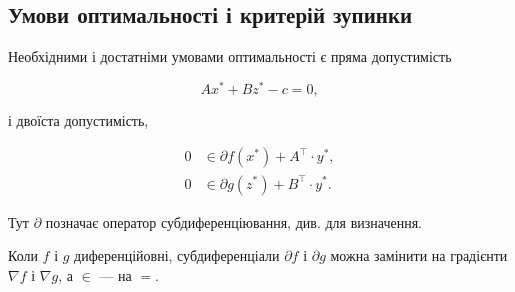 \subsection{Умови оптимальності і критерій зупинки}

\begin{lemma}
    Необхідними і достатніми умовами оптимальності є пряма допустимість
    
    \begin{equation}
    	\label{eq:3.8}
    	A x^* + B z^* - c = 0,
    \end{equation}
    
    і двоїста допустимість,
    
    \begin{align}
    	\label{eq:3.9}
    	0 &\in \partial f \left( x^* \right) + A^\intercal \cdot y^*, \\
    	\label{eq:3.10}
    	0 &\in \partial g \left( z^* \right) + B^\intercal \cdot y^*.
    \end{align}
\end{lemma}

\begin{remark}
    Тут $\partial$ позначає оператор субдиференціювання, див. \cite{140, 19, 99} для визначення. 
\end{remark}

\begin{remark}
    Коли $f$ і $g$ диференційовні, субдиференціали $\partial f$ і $\partial g$ можна замінити на градієнти $\nabla f$ і $\nabla g$, а $\in$ --- на $=$.
\end{remark}

